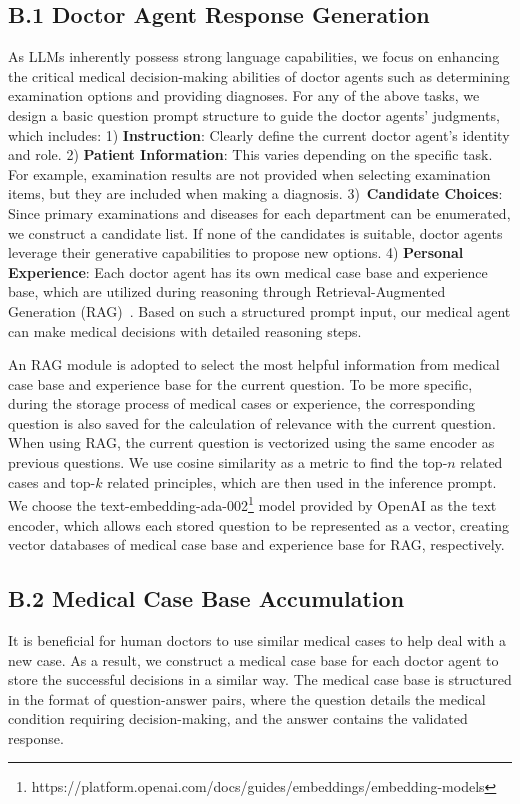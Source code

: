 \documentclass[fleqn,12pt]{wlscirep}
\begin{document}
\subsection*{B.1 Doctor Agent Response Generation}
As LLMs inherently possess strong language capabilities, we focus on enhancing the critical medical decision-making abilities of doctor agents such as determining examination options and providing diagnoses. For any of the above tasks, we design a basic question prompt structure to guide the doctor agents' judgments, which includes: 1) \textbf{Instruction}: Clearly define the current doctor agent’s identity and role. 2) \textbf{Patient Information}: This varies depending on the specific task. For example, examination results are not provided when selecting examination items, but they are included when making a diagnosis. 3)~\textbf{Candidate Choices}: Since primary examinations and diseases for each department can be enumerated, we construct a candidate list. If none of the candidates is suitable, doctor agents leverage their generative capabilities to propose new options. 4) \textbf{Personal Experience}: Each doctor agent has its own medical case base and experience base, which are utilized during reasoning through Retrieval-Augmented Generation (RAG)~\cite{}. Based on such a structured prompt input, our medical agent can make medical decisions with detailed reasoning steps.

An RAG module is adopted to select the most helpful information from medical case base and experience base for the current question. To be more specific, during the storage process of medical cases or experience, the corresponding question is also saved for the calculation of relevance with the current question. When using RAG, the current question is vectorized using the same encoder as previous questions. We use cosine similarity as a metric to find the top-$n$ related cases and top-$k$ related principles, which are then used in the inference prompt. We choose the text-embedding-ada-002\footnote{https://platform.openai.com/docs/guides/embeddings/embedding-models} model provided by OpenAI as the text encoder, which allows each stored question to be represented as a vector, creating vector databases of medical case base and experience base for RAG, respectively.  

\subsection*{B.2 Medical Case Base Accumulation}
It is beneficial for human doctors to use similar medical cases to help deal with a new case. As a result, we construct a medical case base for each doctor agent to store the successful decisions in a similar way. The medical case base is structured in the format of question-answer pairs, where the question details the medical condition requiring decision-making, and the answer contains the validated response. 
\end{document}
